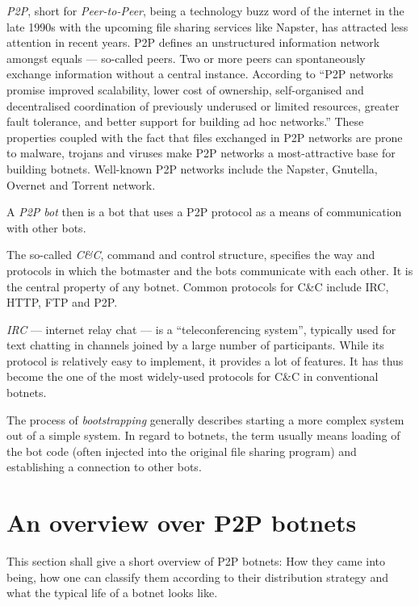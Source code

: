 \documentclass{llncs}
\begin{document}
{\it P2P}, short for {\it Peer-to-Peer}, being a technology buzz word
of the internet in the late 1990s with the upcoming file sharing
services like Napster\cite{napster}, has attracted less attention in
recent years. P2P defines an unstructured information network amongst
equals --- so-called peers. Two or more peers can spontaneously
exchange information without a central instance. According to
\cite{schoder2005core} ``P2P networks promise improved scalability,
lower cost of ownership, self-organised and decentralised coordination
of previously underused or limited resources, greater fault tolerance,
and better support for building ad hoc networks.''  These properties
coupled with the fact that files exchanged in P2P networks are prone
to malware, trojans and viruses make P2P networks a most-attractive
base for building botnets.  Well-known P2P networks include the
Napster, Gnutella, Overnet and Torrent network.  

A {\it P2P bot} then is a bot that uses a P2P protocol as a means of
communication with other bots.

The so-called {\it C\&C}, command and control structure, specifies
the way and protocols in which the botmaster and the bots communicate
with each other. It is the central property of any botnet. Common
protocols for C\&C include IRC, HTTP, FTP and
P2P.\cite{borgaonkar2010analysis}

{\it IRC} --- internet relay chat --- is a ``teleconferencing
system''\cite{irc}, typically used for text chatting in channels
joined by a large number of participants. While its protocol is
relatively easy to implement, it provides a lot of features. It has
thus become the one of the most widely-used protocols for C\&C in
conventional botnets.

The process of {\it bootstrapping} generally describes starting a more
complex system out of a simple system. In regard to botnets, the
term usually means loading of the bot code (often injected into the
original file sharing program) and establishing a connection to other
bots.\cite{wang2009systematic}


\section{An overview over P2P botnets}
This section shall give a short overview of P2P botnets: How they came
into being, how one can classify them according to their distribution
strategy and what the typical life of a botnet looks like.
\end{document}
